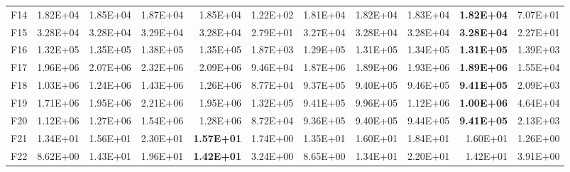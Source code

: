\begin{tabular}{lrrrrrrrrrr}
F14 & 1.82E+04 & 1.85E+04 & 1.87E+04 & 1.85E+04 & 1.22E+02 & 1.81E+04 & 1.82E+04 & 1.83E+04 & \textbf{1.82E+04} & 7.07E+01 \\
F15 & 3.28E+04 & 3.28E+04 & 3.29E+04 & 3.28E+04 & 2.79E+01 & 3.27E+04 & 3.28E+04 & 3.28E+04 & \textbf{3.28E+04} & 2.27E+01 \\
F16 & 1.32E+05 & 1.35E+05 & 1.38E+05 & 1.35E+05 & 1.87E+03 & 1.29E+05 & 1.31E+05 & 1.34E+05 & \textbf{1.31E+05} & 1.39E+03 \\
F17 & 1.96E+06 & 2.07E+06 & 2.32E+06 & 2.09E+06 & 9.46E+04 & 1.87E+06 & 1.89E+06 & 1.93E+06 & \textbf{1.89E+06} & 1.55E+04 \\
F18 & 1.03E+06 & 1.24E+06 & 1.43E+06 & 1.26E+06 & 8.77E+04 & 9.37E+05 & 9.40E+05 & 9.46E+05 & \textbf{9.41E+05} & 2.09E+03 \\
F19 & 1.71E+06 & 1.95E+06 & 2.21E+06 & 1.95E+06 & 1.32E+05 & 9.41E+05 & 9.96E+05 & 1.12E+06 & \textbf{1.00E+06} & 4.64E+04 \\
F20 & 1.12E+06 & 1.27E+06 & 1.54E+06 & 1.28E+06 & 8.72E+04 & 9.36E+05 & 9.40E+05 & 9.44E+05 & \textbf{9.41E+05} & 2.13E+03 \\
F21 & 1.34E+01 & 1.56E+01 & 2.30E+01 & \textbf{1.57E+01} & 1.74E+00 & 1.35E+01 & 1.60E+01 & 1.84E+01 & 1.60E+01 & 1.26E+00 \\
F22 & 8.62E+00 & 1.43E+01 & 1.96E+01 & \textbf{1.42E+01} & 3.24E+00 & 8.65E+00 & 1.34E+01 & 2.20E+01 & 1.42E+01 & 3.91E+00 \\
\bottomrule
\end{tabular}
